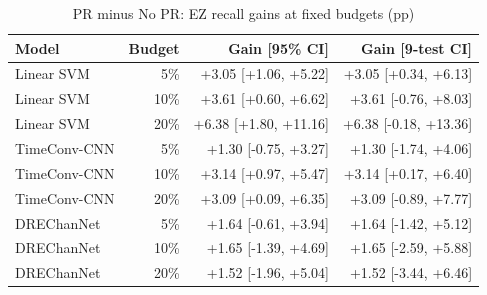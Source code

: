 \begin{table}[t]
\centering
\caption{PR minus No PR: EZ recall gains at fixed budgets (pp)}
\small
\begin{tabular}{lrrr}
\toprule
Model & Budget & Gain [95\% CI] & Gain [9-test CI] \\
\midrule
Linear SVM & 5\% & +3.05 [+1.06, +5.22] & +3.05 [+0.34, +6.13] \\
Linear SVM & 10\% & +3.61 [+0.60, +6.62] & +3.61 [-0.76, +8.03] \\
Linear SVM & 20\% & +6.38 [+1.80, +11.16] & +6.38 [-0.18, +13.36] \\
TimeConv-CNN & 5\% & +1.30 [-0.75, +3.27] & +1.30 [-1.74, +4.06] \\
TimeConv-CNN & 10\% & +3.14 [+0.97, +5.47] & +3.14 [+0.17, +6.40] \\
TimeConv-CNN & 20\% & +3.09 [+0.09, +6.35] & +3.09 [-0.89, +7.77] \\
DREChanNet & 5\% & +1.64 [-0.61, +3.94] & +1.64 [-1.42, +5.12] \\
DREChanNet & 10\% & +1.65 [-1.39, +4.69] & +1.65 [-2.59, +5.88] \\
DREChanNet & 20\% & +1.52 [-1.96, +5.04] & +1.52 [-3.44, +6.46] \\
\bottomrule
\end{tabular}
\end{table}
